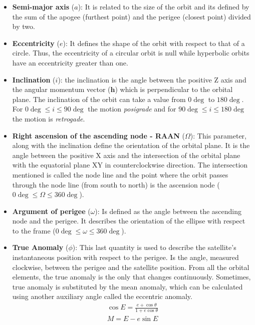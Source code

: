 \begin{itemize}
\item\textbf{Semi-major axis} ($a$): It is related to the size of the orbit and its defined by the sum of the apogee (furthest point) and the perigee (closest point) divided by two.
\item\textbf{Eccentricity} ($e$): It defines the shape of the orbit with respect to that of a circle. Thus, the eccentricity of a circular orbit is null while hyperbolic orbits have an eccentricity greater than one.
\item\textbf{Inclination} ($i$): the inclination is the angle between the positive Z axis and the angular momentum vector ($\textbf{h}$) which is perpendicular to the orbital plane. The inclination of the orbit can take a value from $0\deg$ to $180\deg$. For $0\deg\leq i\leq 90\deg$ the motion \textit{posigrade} and for $90\deg\leq i\leq 180\deg$ the motion is \textit{retrogade}.
\item\textbf{Right ascension of the ascending node - RAAN} ($\Omega$): This parameter, along with the inclination define the orientation of the orbital plane. It is the angle between the positive X axis and the intersection of the orbital plane with the equatorial plane XY in counterclockwise direction. The intersection mentioned is called the node line and the point where the orbit passes through the node line (from south to north) is the ascension node ($0\deg\leq \Omega\leq 360\deg$).
\item\textbf{Argument of perigee} ($\omega$): Is defined as the angle between the ascending node and the perigee. It describes the orientation of the ellipse with respect to the frame ($0\deg\leq \omega\leq 360\deg$). 
\item\textbf{True Anomaly} ($\phi$): This last quantity is used to describe the satellite's instantaneous position with respect to the perigee. Is the angle, measured clockwise, between the perigee and the satellite position. From all the orbital elements, the true anomaly is the only that changes continuously. Sometimes, true anomaly is substituted by the mean anomaly, which can be calculated using another auxiliary angle called the eccentric anomaly.
\begin{equation}
\begin{gathered}
\cos E=\frac{e+\cos \theta}{1+e\cos \theta}\\
M=E-e\sin E
\end{gathered}
\end{equation}

\end{itemize}

